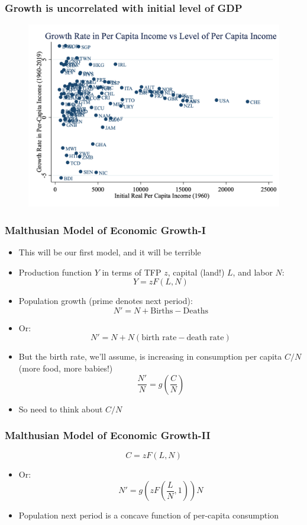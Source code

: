 \documentclass{beamer}
\begin{document}
\begin{frame}
\frametitle[alignment=center]{Growth is uncorrelated with initial level of GDP}
\begin{figure}
\centering
\includegraphics[scale=0.25]{Figures/Fig_7pt3a.png}
\end{figure}
\end{frame}

\begin{frame}
\frametitle[alignment=center]{Malthusian Model of Economic Growth-I}
\begin{itemize}
\item This will be our first model, and it will be terrible
\bigskip
\item Production function $Y$ in terms of TFP $z$, capital (land!) $L$, and labor $N$:
$$Y=zF(L,N)$$
\item Population growth (prime denotes next period):
$$N'=N+\text{Births}-\text{Deaths}$$
\item Or:
$$N'=N+N(\text{birth rate}-\text{death rate})$$
\item But the birth rate, we'll assume, is increasing in consumption per capita $C/N$ (more food, more babies!)
$$\frac{N'}{N}=g\left(\frac{C}{N}\right)$$
\item So need to think about $C/N$
\end{itemize}
\end{frame}

\begin{frame}
\frametitle[alignment=center]{Malthusian Model of Economic Growth-II}
$$C=zF(L,N)$$
\begin{itemize}
\item Or:
$$N'=g\left(zF\left(\frac{L}{N},1\right)\right)N$$
\item Population next period is a concave function of per-capita consumption 
\end{itemize}
\end{frame}
\end{document}
